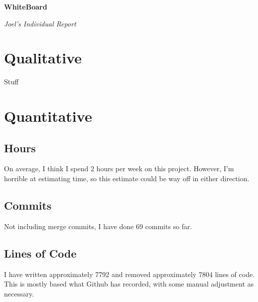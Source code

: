 \documentclass[12 pt]{article}
\begin{document}
\begin{center}

    \huge{\textbf{WhiteBoard}}

    \huge{\textit{Joel's Individual Report}}

\end{center}

\vspace{10 pt}

\section{Qualitative}

Stuff

\section{Quantitative}

\subsection{Hours}

On average, I think I spend 2 hours per week on this project. However, I'm
horrible at estimating time, so this estimate could be way off in either
direction.

\subsection{Commits}

Not including merge commits, I have done 69 commits so far.

\subsection{Lines of Code}

I have written approximately 7792 and removed approximately 7804 lines of code.
This is mostly based what Github has recorded, with some manual adjustment as
necessary.
\end{document}
